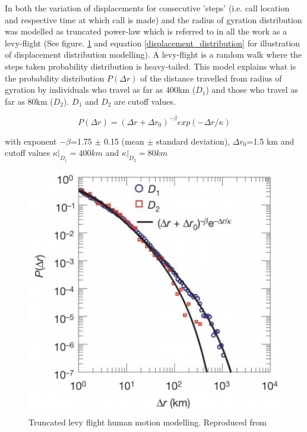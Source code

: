 \documentclass[12pt, a4paper]{report}
\theoremstyle{definition}
\theoremstyle{definition}%
\theoremstyle{definition}%
\theoremstyle{definition}%
\theoremstyle{definition}%
\theoremstyle{definition}%
\begin{document}
In \cite{Gonzalez2008} both the variation of displacements for consecutive 'steps' (i.e. call location and respective time at which call is made) and the radius of gyration distribution was modelled as truncated power-law which is referred to in all the work as a levy-flight (See figure. \ref{fig:levy_flight} and equation \ref{displacement_distribution} for illustration of displacement distribution modelling). A levy-flight is a random walk where the steps taken probability distribution is heavy-tailed. This model explains what is the probability distribution $P(\Delta r)$  of the distance travelled from radius of gyration by individuals who travel as far as 400km ($D_1$) and those who travel as far as 80km ($D_2$). $D_1$ and $D_2$ are cutoff values. 

\begin{equation}\label{displacement_distribution}
P(\Delta r) = (\Delta r + \Delta r_{0})^{-\beta}  exp(-\Delta r/\kappa)
\end{equation} 

with exponent $-\beta$=1.75 $\pm$ 0.15 (mean $\pm$ standard deviation), $\Delta r_{0}$=1.5 km and cutoff values $\kappa|_{D_{1}}=400 km$ and $\kappa|_{D_{2}}=80 km$ 

\begin{figure}[h]	
	\includegraphics[scale=0.75]{truncated_power_law}
	\centering
	\caption[Truncated Levy Flight]{Truncated levy flight human motion modelling. Reproduced from \cite{Gonzalez2008}}
	\label{fig:levy_flight}
\end{figure}
\end{document}

